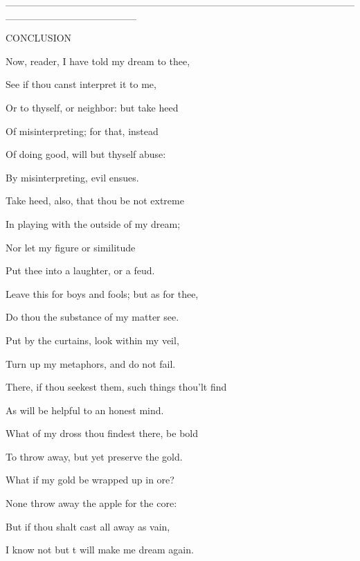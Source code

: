 __________________________________________________________________

CONCLUSION


Now, reader, I have told my dream to thee,

See if thou canst interpret it to me,

Or to thyself, or neighbor: but take heed

Of misinterpreting; for that, instead

Of doing good, will but thyself abuse:

By misinterpreting, evil ensues.

Take heed, also, that thou be not extreme

In playing with the outside of my dream;

Nor let my figure or similitude

Put thee into a laughter, or a feud.

Leave this for boys and fools; but as for thee,

Do thou the substance of my matter see.

Put by the curtains, look within my veil,

Turn up my metaphors, and do not fail.

There, if thou seekest them, such things thou'lt find

As will be helpful to an honest mind.

What of my dross thou findest there, be bold

To throw away, but yet preserve the gold.

What if my gold be wrapped up in ore?

None throw away the apple for the core:

But if thou shalt cast all away as vain,

I know not but t will make me dream again.
